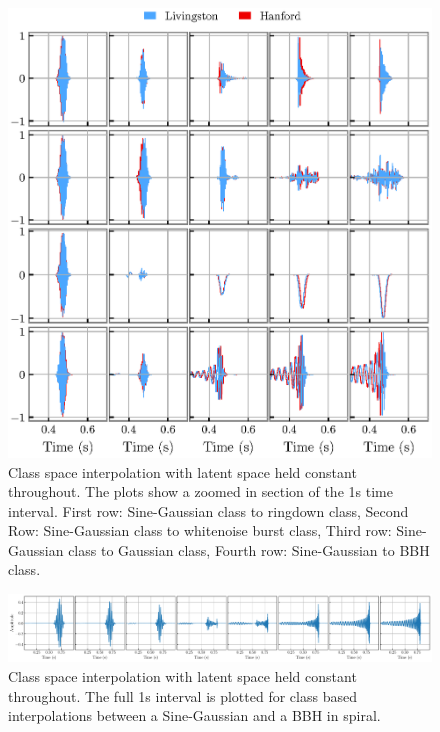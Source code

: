 \documentclass[12pt]{iopart}
\begin{document}
\begin{figure}
    \centering
    \includegraphics[width=\textwidth]{figures/class_interpolation.eps}
    \caption{Class space interpolation with latent space held constant throughout. The plots show a zoomed in section of the 1s time interval. First row: Sine-Gaussian class to ringdown class, Second Row: Sine-Gaussian class to whitenoise burst class, Third row: Sine-Gaussian class to Gaussian class, Fourth row: Sine-Gaussian to BBH class.}
    \label{fig:c_interp}
\end{figure}

\begin{figure}
    \centering
    \includegraphics[width=\textwidth]{figures/sg_bbh_interp.pdf}
    \caption{Class space interpolation with latent space held constant throughout. The full 1s interval is plotted for class based interpolations between a Sine-Gaussian and a BBH in spiral.}
    \label{fig:sgbbh_interp}
\end{figure}
\end{document}
